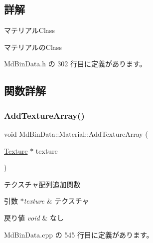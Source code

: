 \subsection{詳解}
マテリアル\+Class 

マテリアルの\+Class 

 Md\+Bin\+Data.\+h の 302 行目に定義があります。



\subsection{関数詳解}
\mbox{\label{class_md_bin_data_1_1_material_a8d6a7d5c0f7f11d84a155846c467a580}} 
\subsubsection{\texorpdfstring{Add\+Texture\+Array()}{AddTextureArray()}}
{\footnotesize\ttfamily void Md\+Bin\+Data\+::\+Material\+::\+Add\+Texture\+Array (\begin{DoxyParamCaption}\item[{\mbox{\hyperlink{class_md_bin_data_1_1_material_1_1_texture}{Texture}} $\ast$}]{texture }\end{DoxyParamCaption})}



テクスチャ配列追加関数 


\begin{DoxyParams}{引数}
{\em $\ast$texture} & テクスチャ \\
\hline
\end{DoxyParams}

\begin{DoxyRetVals}{戻り値}
{\em void} & なし \\
\hline
\end{DoxyRetVals}


 Md\+Bin\+Data.\+cpp の 545 行目に定義があります。

\mbox{\label{class_md_bin_data_1_1_material_a5de4c3bff10499fb4fb861b7a13b6180}} 
